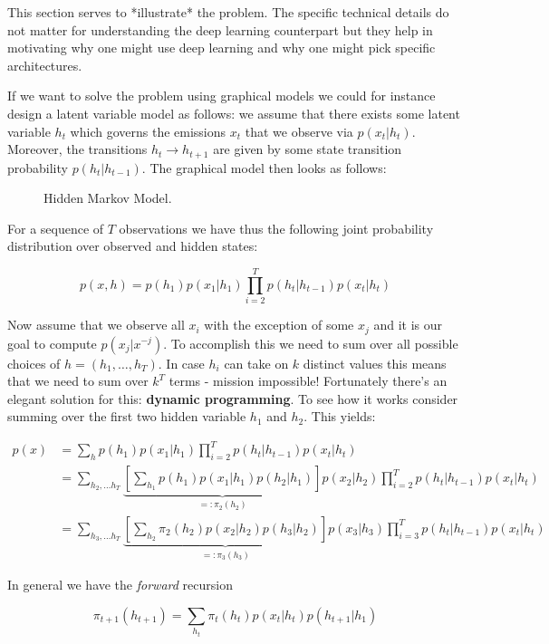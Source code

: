 This section serves to *illustrate* the problem. The specific technical details do not matter for understanding the deep learning counterpart but they help in motivating why one might use deep learning and why one might pick specific architectures.

If we want to solve the problem using graphical models we could for instance design a latent variable model as follows: we assume that there exists some latent variable $h_t$ which governs the emissions $x_t$ that we observe via $p(x_t|h_t)$. Moreover, the transitions $h_t \to h_{t+1}$ are given by some state transition probability $p(h_t|h_{t-1})$. The graphical model then looks as follows:

\begin{figure}[hpt]
	\centering
	
	\caption{Hidden Markov Model.}
	\label{fig:hmm}
\end{figure}

For a sequence of $T$ observations we have thus the following joint probability distribution over observed and hidden states:

$$p(x,h) = p(h_1) p(x_1|h_1) \prod_{i=2}^T p(h_t|h_{t-1}) p(x_t|h_t)$$

Now assume that we observe all $x_i$ with the exception of some $x_j$ and it is our goal to compute $p(x_j|x^{-j})$. To accomplish this we need to sum over all possible choices of $h = (h_1, \ldots, h_T)$. In case $h_i$ can take on $k$ distinct values this means that we need to sum over $k^T$ terms - mission impossible! Fortunately there's an elegant solution for this: \textbf{dynamic programming}. To see how it works consider summing over the first two hidden variable $h_1$ and $h_2$. This yields:

$$\begin{aligned}
    p(x) & = \sum_h p(h_1) p(x_1|h_1) \prod_{i=2}^T p(h_t|h_{t-1}) p(x_t|h_t) \\
    & = \sum_{h_2, \ldots h_T} \underbrace{\left[\sum_{h_1} p(h_1) p(x_1|h_1) p(h_2|h_1)\right]}_{=: \pi_2(h_2)}
    p(x_2|h_2) \prod_{i=2}^T p(h_t|h_{t-1}) p(x_t|h_t) \\
    & = \sum_{h_3, \ldots h_T} \underbrace{\left[\sum_{h_2} \pi_2(h_2) p(x_2|h_2) p(h_3|h_2)\right]}_{=: \pi_3(h_3)}
    p(x_3|h_3) \prod_{i=3}^T p(h_t|h_{t-1}) p(x_t|h_t)
\end{aligned}$$

In general we have the \textit{forward} recursion

$$\pi_{t+1}(h_{t+1}) = \sum_{h_t} \pi_t(h_t) p(x_t|h_t) p(h_{t+1}|h_1)$$

